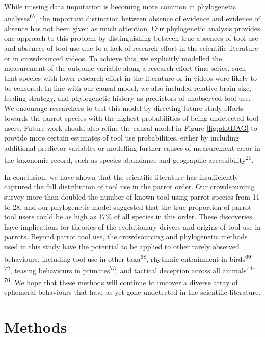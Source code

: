 \documentclass[
  man,floatsintext]{apa6}
\begin{document}
While missing data imputation is becoming more common in phylogenetic
analyses\textsuperscript{67}, the important distinction between absence of
evidence and evidence of absence has not been given as much attention. Our
phylogenetic analysis provides one approach to this problem by distinguishing
between true absences of tool use and absences of tool use due to a lack of
research effort in the scientific literature or in crowdsourced videos. To
achieve this, we explicitly modelled the measurement of the outcome variable
along a research effort time series, such that species with lower research
effort in the literature or in videos were likely to be censored. In line with
our causal model, we also included relative brain size, feeding strategy, and
phylogenetic history as predictors of unobserved tool use. We encourage
researchers to test this model by directing future study efforts towards the
parrot species with the highest probabilities of being undetected tool-users.
Future work should also refine the causal model in Figure \ref{fig:plotDAG} to
provide more certain estimates of tool use probabilities, either by including
additional predictor variables or modelling further causes of measurement error
in the taxonomic record, such as species abundance and geographic
accessibility\textsuperscript{20}.

In conclusion, we have shown that the scientific literature has insufficiently
captured the full distribution of tool use in the parrot order. Our
crowdsourcing survey more than doubled the number of known tool using parrot
species from 11 to 28, and our phylogenetic model suggested that the true
proportion of parrot tool users could be as high as 17\% of all species in this
order. These discoveries have implications for theories of the evolutionary
drivers and origins of tool use in parrots. Beyond parrot tool use, the
crowdsourcing and phylogenetic methods used in this study have the potential to
be applied to other rarely observed behaviours, including tool use in other
taxa\textsuperscript{68}, rhythmic entrainment in birds\textsuperscript{69--72}, teasing behaviours in primates\textsuperscript{73}, and
tactical deception across all animals\textsuperscript{74--76}.
We hope that these methods will continue to uncover a diverse array of ephemeral
behaviours that have as yet gone undetected in the scientific literature.

\hypertarget{methods}{%
\section{Methods}\label{methods}}
\end{document}
